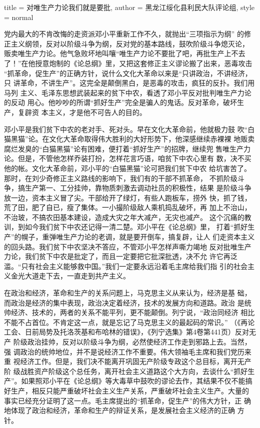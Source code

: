 \begin{hongqiarticle}{
        title  = {对唯生产力论我们就是要批},
        author = {黑龙江绥化县利民大队评论组},
        style  = normal
    }

    党内最大的不肯改悔的走资派邓小平重新工作不久，就抛出“三项指示为纲”
    的修正主义纲领，反对以阶级斗争为纲，反对党的基本路线，鼓吹阶级斗争熄灭论，
    贩卖唯生产力论。他气急败坏地叫嚷“唯生产力论不要批了吧，再批生产上不去
    了！”在他授意炮制的《论总纲》里，又把这套修正主义谬论搬了出来，恶毒攻击
    “抓革命，促生产”的正确方针，说什么文化大革命以来是“只讲政治，不讲经济，只
    讲革命，不讲生产”。这完全是颠倒黑白，是恶毒的攻击，疯狂的反扑。我们用马列
    主义、毛泽东思想武装起来的贫下中农，看透了邓小平反对批判唯生产力论的反动
    用心。他吵吵的所谓“抓好生产”完全是骗人的鬼话。反对革命，破坏生产，复辟资
    本主义，才是他不可告人的目的。

    邓小平是我们贫下中农的老对手、死对头。早在文化大革命前，他就极力鼓
    吹“白猫黑猫”论。在文化大革命取得伟大胜利的大好形势下，他深感继续赤裸裸
    地贩卖腐烂发臭的“白猫黑猫”论有困难，便打着“抓好生产”的招牌，继续兜
    售唯生产力论。但是，不管他怎样乔装打扮，怎样花言巧语，咱贫下中农心里有
    数，决不买他的帐。文化大革命前，邓小平的“白猫黑猫”论可把我们贫下中农
    给坑害苦了。那时，在刘少奇修正主义路线的影响下，我们有的干部不抓革命，
    不抓阶级斗争，搞生产第一、工分挂帅，靠物质刺激去调动社员的积极性，结果
    是阶级斗争放一边，资本主义冒了尖。干部给开了绿灯，有些人跑板车，捞外
    快，抓了钱，荒了田，肥了自已，瘦了集体。一小撮阶级敌人乘机捣乱破坏，再
    加上不治山，不治玻，不搞农田基本建设，造成大灾之年大减产，无灾也减产。
    这个沉痛的教训，到如今我们贫下中农还记得一清二楚。邓小平在《论总纲》里，
    打着“抓好生产”的幌子，重弹唯生产力论的老调，就是要开倒车，搞复辟，让人
    们走资本主义的回头路。我们贫下中农坚决不答应，不管邓小平怎样声嘶力竭地
    反对批唯生产力论，我们贫下中农是批定了，而且一定要把它批深批透，决不允
    许它再泛滥。“只有社会主义能够救中国。”我们一定要永远沿着毛主席给我们指
    引的社会主义金光大道走下去，一直走到共产主义。

    在政治和经济，革命和生产的关系问题上，马克思主义从来认为，经济是基
    础，而政治是经济的集中表现，政治决定着经济，技术的发展方向和道路。政治
    是统帅经济、技术的，两者的关系不能平列，更不能颠倒。列宁说，“政治同经济
    相比不能不占首位。不肯定这一点，就是忘记了马克思主义的最起码的常识。”
    （《再论工会、日前局势及托洛茨基和布哈林的错误》，《列宁选集》第4卷第441页）反对无产
    阶级政治挂帅，反对以阶级斗争为纲，必然使经济工作走到邪路上去。当然，强
    调政治的统帅地位，并不是说经济工作不重要。伟大领袖毛主席和我们党历来重
    视经济工作。但是，我们决不能离开巩固无产阶级专政这个总目标，离开无产阶
    级战胜资产阶级这个总任务，离开社会主义道路这个大方向，去谈什么“抓好生
    产”。如果照邓小平在《论总纲》等大毒草中鼓吹的谬论去作，其结果不仅不能搞
    好生产，相反只能严重破坏社会主义生产关系，严重破坏社会主义生产。大量的
    事实已经充分证明了这一点。毛主席提出的“抓革命，促生产”的伟大方针，正
    确地体现了政治和经济，革命和生产的辩证关系，是发展社会主义经济的正确
    方针。


\end{hongqiarticle}
